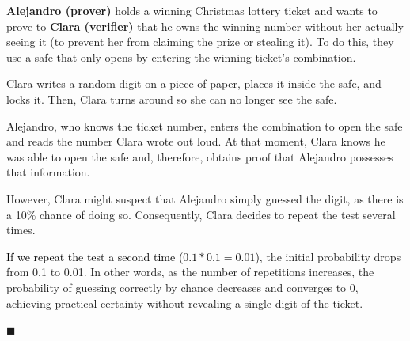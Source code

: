 \documentclass[a4paper,12pt]{report}
\begin{document}
	\begin{mi_ejemplo}[H]
		\centering
		
		\begin{minipage}{0.95\textwidth}
			
			\noindent \textbf{Alejandro (prover)} holds a winning Christmas lottery ticket and wants to prove to \textbf{Clara (verifier)} that he owns the winning number without her actually seeing it (to prevent her from claiming the prize or stealing it). To do this, they use a safe that only opens by entering the winning ticket's combination.
			
			\vspace{0.2cm}
			
			\noindent Clara writes a random digit on a piece of paper, places it inside the safe, and locks it. Then, Clara turns around so she can no longer see the safe.
			
			\vspace{0.2cm}
			
			\noindent Alejandro, who knows the ticket number, enters the combination to open the safe and reads the number Clara wrote out loud. At that moment, Clara knows he was able to open the safe and, therefore, obtains proof that Alejandro possesses that information. 
			
			\vspace{0.2cm}
			
			\noindent However, Clara might suspect that Alejandro simply guessed the digit, as there is a 10\% chance of doing so. Consequently, Clara decides to repeat the test several times.
			
			\vspace{0.2cm}
			
			\noindent \textcolor{black}{If we repeat the test a second time ($0.1 * 0.1 = 0.01$)}, the initial probability drops from 0.1 to 0.01. In other words, as the number of repetitions increases, the probability of guessing correctly by chance decreases and converges to 0, achieving practical certainty without revealing a single digit of the ticket.
			
		\end{minipage}
		\caption{Zero Knowledge Proof} 
		\label{ex:loteria-ingles}
		
		\hspace*{\fill} $\blacksquare$
		
	\end{mi_ejemplo}
	
	\vspace{0.25cm}
	
\end{document}
